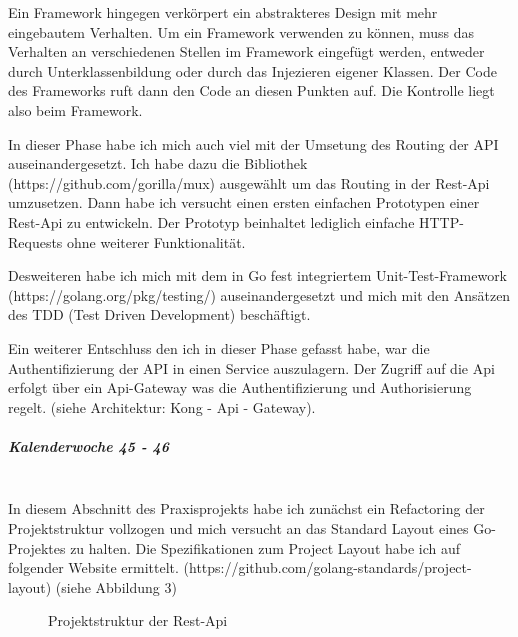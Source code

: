 \documentclass[12pt]{article}
\begin{document}
Ein Framework hingegen verkörpert ein abstrakteres Design mit mehr eingebautem Verhalten. Um ein Framework verwenden zu können, muss das Verhalten an verschiedenen Stellen im Framework eingefügt werden, entweder durch Unterklassenbildung oder durch das Injezieren eigener Klassen. Der Code des Frameworks ruft dann den Code an diesen Punkten auf. Die Kontrolle liegt also beim Framework.

In dieser Phase habe ich mich auch viel mit der Umsetung des Routing der API auseinandergesetzt. Ich habe dazu die Bibliothek  (https://github.com/gorilla/mux) ausgewählt um das Routing in der Rest-Api umzusetzen.
Dann habe ich versucht einen ersten einfachen Prototypen einer Rest-Api zu entwickeln. Der Prototyp beinhaltet lediglich einfache HTTP-Requests ohne weiterer Funktionalität.

Desweiteren habe ich mich mit dem in Go fest integriertem Unit-Test-Framework (https://golang.org/pkg/testing/) auseinandergesetzt und mich mit den Ansätzen des TDD (Test Driven Development) beschäftigt.

Ein weiterer Entschluss den ich in dieser Phase gefasst habe, war die Authentifizierung der API in einen Service auszulagern. Der Zugriff auf die Api erfolgt über ein Api-Gateway was die Authentifizierung und Authorisierung regelt. (siehe Architektur: Kong - Api - Gateway).

\subparagraph{Kalenderwoche 45 - 46}\mbox{}\\

In diesem Abschnitt des Praxisprojekts habe ich zunächst ein Refactoring der Projektstruktur vollzogen und mich versucht an das Standard Layout eines Go-Projektes zu halten. Die Spezifikationen zum Project Layout habe ich auf folgender Website ermittelt. (https://github.com/golang-standards/project-layout) (siehe Abbildung 3)
\bigbreak
\renewcommand*\DTstylecomment{\rmfamily\color{red}\textsc}
\begin{figure}[h!]
\centering
{}
\caption{Projektstruktur der Rest-Api}
\end{figure}
\end{document}
